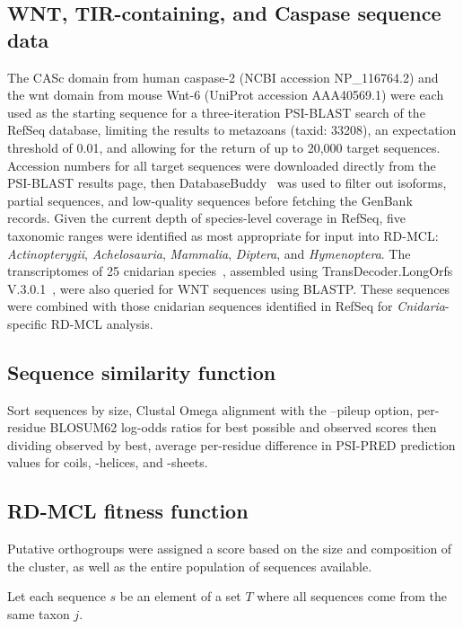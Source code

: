 \documentclass[twocolumn]{bmcart}  %
\begin{document}
\subsection{WNT, TIR-containing, and Caspase sequence data}\label{subsec:wnt,Tir-containing,AndCaspaseSequenceData}
The CASc domain from human caspase-2 (NCBI accession NP\_116764.2) and the wnt domain from mouse Wnt-6 (UniProt accession AAA40569.1) were each used as the starting sequence for a three-iteration PSI-BLAST search of the RefSeq database, limiting the results to metazoans (taxid: 33208), an expectation threshold of 0.01, and allowing for the return of up to 20,000 target sequences.
Accession numbers for all target sequences were downloaded directly from the PSI-BLAST results page, then DatabaseBuddy~\cite{Bond:2017bj} was used to filter out isoforms, partial sequences, and low-quality sequences before fetching the GenBank records.
Given the current depth of species-level coverage in RefSeq, five taxonomic ranges were identified as most appropriate for input into RD-MCL: \textit{Actinopterygii}, \textit{Achelosauria}, \textit{Mammalia}, \textit{Diptera}, and \textit{Hymenoptera}.
The transcriptomes of 25 cnidarian species~\cite{Zapata:2015cc}, assembled using TransDecoder.LongOrfs V.3.0.1~\cite{Haas:2013jq}, were also queried for WNT sequences using BLASTP\@.
These sequences were combined with those cnidarian sequences identified in RefSeq for \textit{Cnidaria}-specific RD-MCL analysis.


\subsection{Sequence similarity function}\label{subsec:seq-sim-func}
Sort sequences by size, Clustal Omega alignment with the --pileup option, per-residue BLOSUM62 log-odds ratios for best possible and observed scores then dividing observed by best, average per-residue difference in PSI-PRED prediction values for coils, \textalpha-helices, and \textbeta-sheets.


\subsection{RD-MCL fitness function}\label{subsec:rd-mclFitnessFunction}
Putative orthogroups were assigned a score based on the size and composition of the cluster, as well as the entire population of sequences available.

Let each sequence $s$ be an element of a set $T$ where all sequences come from the same taxon $j$.
\end{document}
